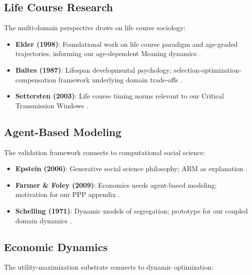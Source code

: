\subsection{Life Course Research}

The multi-domain perspective draws on life course sociology:

\begin{itemize}
\item \textbf{Elder (1998)}: Foundational work on life course paradigm and
      age-graded trajectories, informing our age-dependent Meaning dynamics
      \citep{elder1998children}.

\item \textbf{Baltes (1987)}: Lifespan developmental psychology; selection-optimization-compensation
      framework underlying domain trade-offs \citep{baltes1987theoretical}.

\item \textbf{Settersten (2003)}: Life course timing norms relevant to our
      Critical Transmission Windows \citep{settersten2003invitation}.
\end{itemize}

\subsection{Agent-Based Modeling}

The validation framework connects to computational social science:

\begin{itemize}
\item \textbf{Epstein (2006)}: Generative social science philosophy; ABM as
      explanation \citep{epstein2006generative}.

\item \textbf{Farmer \& Foley (2009)}: Economics needs agent-based modeling;
      motivation for our PPP appendix \citep{farmer2009economy}.

\item \textbf{Schelling (1971)}: Dynamic models of segregation; prototype for
      our coupled domain dynamics \citep{schelling1971dynamic}.
\end{itemize}

\subsection{Economic Dynamics}

The utility-maximization substrate connects to dynamic optimization:

